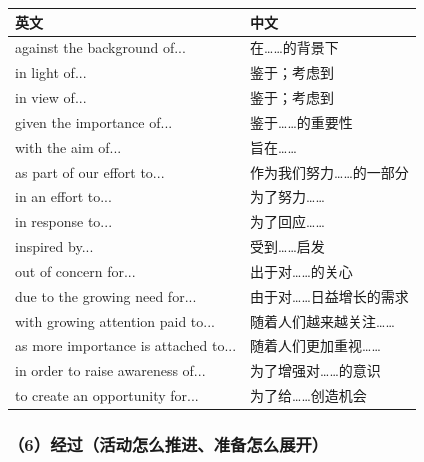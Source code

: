 \documentclass[11pt,a4paper]{ctexart}
\begin{document}
\begin{longtable}{L{9.4cm}L{6.6cm}}
\toprule
\textbf{英文} & \textbf{中文} \\
\midrule
\endhead
\bottomrule
\endlastfoot
against the background of... & 在……的背景下 \\
in light of... & 鉴于；考虑到 \\
in view of... & 鉴于；考虑到 \\
given the importance of... & 鉴于……的重要性 \\
with the aim of... & 旨在…… \\
as part of our effort to... & 作为我们努力……的一部分 \\
in an effort to... & 为了努力…… \\
in response to... & 为了回应…… \\
inspired by... & 受到……启发 \\
out of concern for... & 出于对……的关心 \\
due to the growing need for... & 由于对……日益增长的需求 \\
with growing attention paid to... & 随着人们越来越关注…… \\
as more importance is attached to... & 随着人们更加重视…… \\
in order to raise awareness of... & 为了增强对……的意识 \\
to create an opportunity for... & 为了给……创造机会 \\
\end{longtable}

\subsubsection{（6）经过（活动怎么推进、准备怎么展开）}
\end{document}
